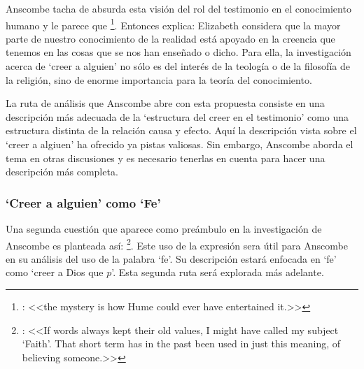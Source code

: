 Anscombe tacha de absurda esta visión del rol del testimonio en el conocimiento
humano\autocite[Cf.~][3]{anscombe2008faith:tobelieve} y le parece que
\footnote{\cite[Cf.~][3]{anscombe2008faith:tobelieve}: <<the mystery
  is how Hume could ever have entertained it.>>}. Entonces explica:
 Elizabeth considera que la mayor parte de nuestro conocimiento de
la realidad está apoyado en la creencia que tenemos en las cosas que se nos han
enseñado o dicho\autocite[Cf.~][3]{anscombe2008faith:tobelieve}. Para ella, la
investigación acerca de `creer a alguien' no sólo es del interés de la teología
o de la filosofía de la religión, sino de enorme importancia para la teoría del
conocimiento\autocite[Cf.~][3]{anscombe2008faith:tobelieve}.

La ruta de análisis que Anscombe abre con esta propuesta consiste en una
descripción más adecuada de la `estructura del creer en el testimonio' como una
estructura distinta de la relación causa y efecto. Aquí la descripción vista
sobre el `creer a algiuen' ha ofrecido ya pistas valiosas. Sin embargo, Anscombe
aborda el tema en otras discusiones y es necesario tenerlas en cuenta para hacer
una descripción más completa.

\subsubsection{`Creer a alguien' como `Fe'}
Una segunda cuestión que aparece como preámbulo en la investigación de Anscombe
es planteada así: \footnote{\cite{anscombe2008faith:tobelieve}: <<If words always kept
  their old values, I might have called my subject `Faith'. That short term has
  in the past been used in just this meaning, of believing someone.>>}. Este uso
de la expresión sera útil para Anscombe en su análisis del uso de la palabra
`fe'. Su descripción estará enfocada en `fe' como `creer a Dios que $p$'. Esta
segunda ruta será explorada más adelante.

